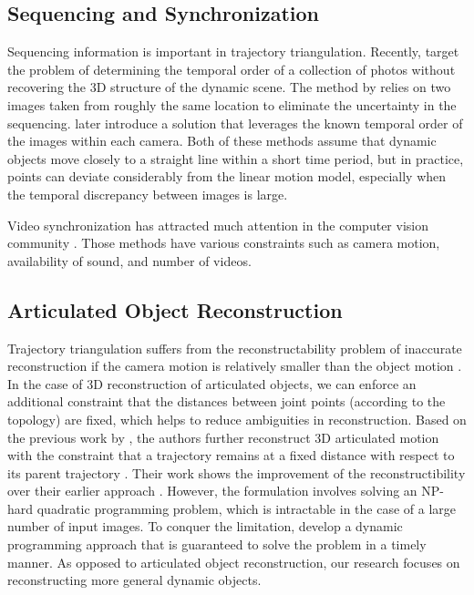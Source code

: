 \subsection{Sequencing and Synchronization}
Sequencing information is important in trajectory triangulation. Recently,
\citet{Basha_ECCV2012, Basha_ICCV2013} target the problem of determining the temporal order of a collection of photos without recovering the 3D structure of the dynamic scene. The method by \citet{Basha_ECCV2012} relies on two images taken from roughly the same location to eliminate the uncertainty in the sequencing. \citet{Basha_ICCV2013} later introduce a solution that leverages the known temporal order of the images within each camera. Both of these methods assume that dynamic objects move closely to a straight line within a short time period, but in practice, points can deviate considerably from the linear motion model, especially when the temporal discrepancy between images is large. 

Video synchronization has attracted much attention in the computer vision community \cite{Tuytelaars_CVPR,shrestha2010synchronization,rao2003view}. Those methods have various constraints such as camera motion, availability of sound, and number of videos. 

\subsection{Articulated Object Reconstruction}
Trajectory triangulation suffers from the reconstructability problem of inaccurate reconstruction if the camera motion is relatively smaller than the object motion \cite{park20153d}. 
In the case of 3D reconstruction of articulated objects, we can enforce an additional constraint that the distances between joint points (according to the topology) are fixed, which helps to reduce ambiguities in reconstruction. 
Based on the previous work by \citet{Park_ECCV2010}, the authors further reconstruct 3D articulated motion with the constraint that a trajectory remains at a fixed distance with respect to its parent trajectory \cite{Park_ICCV2011}. Their work shows the improvement of the reconstructibility over their earlier approach \cite{Park_ECCV2010}.
However, the formulation involves solving an NP-hard quadratic programming problem, which is intractable in the case of a large number of input images. 
To conquer the limitation, \citet{Valmadre_ECCV2012} develop a dynamic programming approach that is guaranteed to solve the problem in a timely manner. 
As opposed to articulated object reconstruction, our research focuses on reconstructing more general dynamic objects. 

